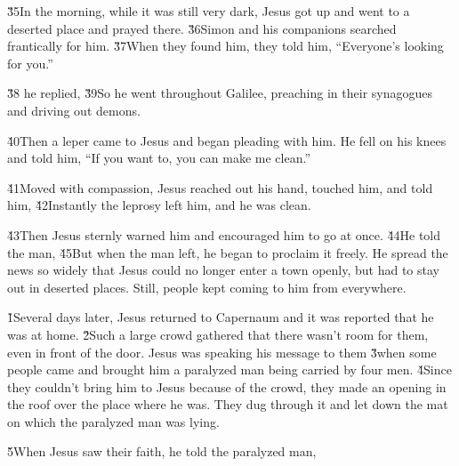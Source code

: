 \v{35}In the morning, while it was still very dark, Jesus got up and went to a deserted place and prayed there. \v{36}Simon and his companions searched frantically for him. \v{37}When they found him, they told him, ``Everyone's looking for you.''

\v{38} he replied,  \v{39}So he went throughout Galilee, preaching in their synagogues and driving out demons.

\v{40}Then a leper came to Jesus and began pleading with him. He fell on his knees and told him, ``If you want to, you can make me clean.''

\v{41}Moved with compassion, Jesus reached out his hand, touched him, and told him,  \v{42}Instantly the leprosy left him, and he was clean.

\v{43}Then Jesus sternly warned him and encouraged him to go at once. \v{44}He told the man,  \v{45}But when the man left, he began to proclaim it freely. He spread the news so widely that Jesus could no longer enter a town openly, but had to stay out in deserted places. Still, people kept coming to him from everywhere.

\v{1}Several days later, Jesus returned to Capernaum and it was reported that he was at home. \v{2}Such a large crowd gathered that there wasn't room for them, even in front of the door. Jesus was speaking his message to them \v{3}when some people came and brought him a paralyzed man being carried by four men. \v{4}Since they couldn't bring him to Jesus because of the crowd, they made an opening in the roof over the place where he was. They dug through it and let down the mat on which the paralyzed man was lying.

\v{5}When Jesus saw their faith, he told the paralyzed man, 

